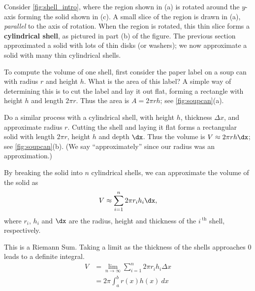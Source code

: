 Consider \autoref{fig:shell_intro}, where the region shown in (a) is rotated around the $y$-axis forming the solid shown in (c). A small slice of the region is drawn in (a), \emph{parallel} to the axis of rotation. When the region is rotated, this thin slice forms a \textbf{cylindrical shell}, as pictured in part (b) of the figure. The previous section approximated a solid with lots of thin disks (or washers); we now approximate a solid with many thin cylindrical shells.

To compute the volume of one shell, first consider the paper label on a soup can with radius $r$ and height $h$. What is the area of this label? A simple way of determining this is to cut the label and lay it out flat, forming a rectangle with height $h$ and length $2\pi r$. Thus the area is $A = 2\pi rh$; see \autoref{fig:soupcan}(a).

Do a similar process with a cylindrical shell, with height $h$, thickness $\Delta x$, and approximate radius $r$. Cutting the shell and laying it flat forms a rectangular solid with length $2\pi r$, height $h$ and depth $\dx$. Thus the volume is $V \approx 2\pi rh\dx$; see \autoref{fig:soupcan}(b). (We say ``approximately'' since our radius was an approximation.)

By breaking the solid into $n$ cylindrical shells, we can approximate the volume of the solid as
\[V \approx \sum_{i=1}^n 2\pi r_ih_i\dx,\]
where $r_i$, $h_i$ and $\dx$ are the radius, height and thickness of the $i\,^\text{th}$ shell, respectively. 

This is a Riemann Sum. Taking a limit as the thickness of the shells approaches 0 leads to a definite integral.
\begin{align*}
V&=\lim_{n\to \infty} \sum_{i=1}^n 2\pi r_i h_i \Delta x\\
&=2\pi \int_a^b r(x)h(x)\ dx
\end{align*}

